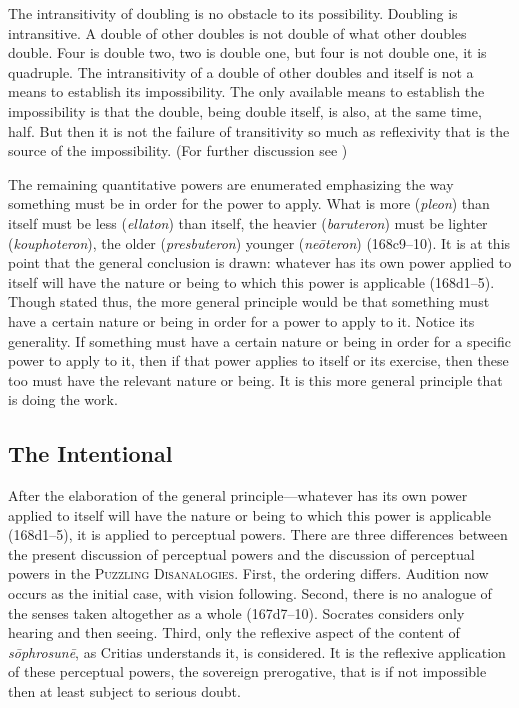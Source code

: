 The intransitivity of doubling is no obstacle to its possibility. Doubling is intransitive. A double of other doubles is not double of what other doubles double. Four is double two, two is double one, but four is not double one, it is quadruple. The intransitivity of a double of other doubles and itself is not a means to establish its impossibility. The only available means to establish the impossibility is that the double, being double itself, is also, at the same time, half. But then it is not the failure of transitivity so much as reflexivity that is the source of the impossibility. (For further discussion see \citealt[4 n10]{McCabe:2007ss})

The remaining quantitative powers are enumerated emphasizing the way something must be in order for the power to apply. What is more (\emph{pleon}) than itself must be less (\emph{ellaton}) than itself, the heavier (\emph{baruteron}) must be lighter (\emph{kouphoteron}), the older (\emph{presbuteron}) younger (\emph{neōteron}) (168c9–10). It is at this point that the general conclusion is drawn: whatever has its own power applied to itself will have the nature or being to which this power is applicable (168d1–5). Though stated thus, the more general principle would be that something must have a certain nature or being in order for a power to apply to it. Notice its generality. If something must have a certain nature or being in order for a specific power to apply to it, then if that power applies to itself or its exercise, then these too must have the relevant nature or being. It is this more general principle that is doing the work.


\subsection{The Intentional} %
\label{sub:the_intentional}

After the elaboration of the general principle—whatever has its own power applied to itself will have the nature or being to which this power is applicable (168d1–5), it is applied to perceptual powers. There are three differences between the present discussion of perceptual powers and the discussion of perceptual powers in the \textsc{Puzzling Disanalogies}. First, the ordering differs. Audition now occurs as the initial case, with vision following. Second, there is no analogue of the senses taken altogether as a whole (167d7–10). Socrates considers only hearing and then seeing. Third, only the reflexive aspect of the content of \emph{sōphrosunē}, as Critias understands it, is considered. It is the reflexive application of these perceptual powers, the sovereign prerogative, that is if not impossible then at least subject to serious doubt.

